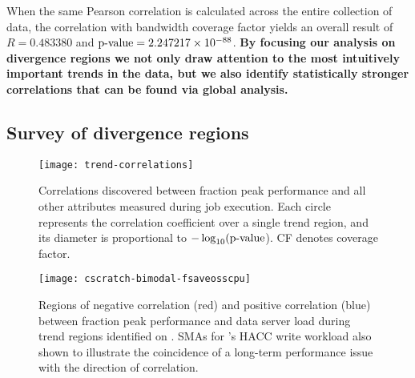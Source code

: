 When the same Pearson correlation is calculated across the entire collection
of \mira \mirafsone data, the correlation with bandwidth coverage factor
yields an overall result of $R = 0.483380$ and $\textup{p-value} =
2.247217\times 10^{-88}$.  \textbf{By focusing our analysis on divergence regions we not only
draw attention to the most intuitively important trends in the data, but we
also identify statistically stronger correlations that can be found via
global analysis.}

\subsection{Survey of divergence regions} \label{sec:results/correlate-all}




\begin{figure}
    \centering
    \texttt{[image: trend-correlations]}
    \vspace{-.35in}
    \caption{Correlations discovered between fraction peak performance and all other attributes measured during job execution.
    Each circle represents the correlation coefficient over a single trend region, and its diameter is proportional to $-\log_{10}(\textup{p-value}$).
    CF denotes coverage factor.}
    \label{fig:trend-correlations}
\end{figure}


\begin{figure}
    \centering
    \texttt{[image: cscratch-bimodal-fsaveosscpu]}
    \vspace{-.35in}
    \caption{Regions of negative correlation (red) and positive correlation (blue) between fraction peak performance and data server load during trend regions identified on \cori.
    SMAs for \cori's HACC write workload also shown to illustrate the coincidence of a long-term performance issue with the direction of correlation.}
    \label{fig:cscratch-bimodal-fsaveosscpu}
\end{figure}

